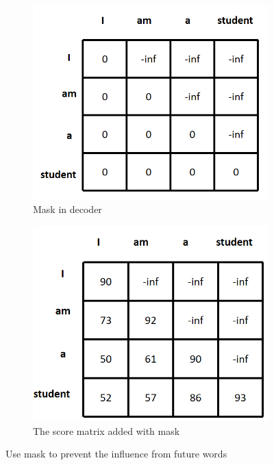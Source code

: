   \begin{figure}[htbp]
		\centering
		\begin{subfigure}{0.45\textwidth}
			\centering
			\includegraphics[width=0.8\linewidth]{example_images/mask}
			\caption{Mask in decoder}
			\label{Mask in decoder}
		\end{subfigure}
		\hfill
		\begin{subfigure}{0.45\textwidth}
			\centering
			\includegraphics[width=0.8\linewidth]{example_images/mask1}
			\caption{The score matrix added with mask}
			\label{The score matrix added with mask}
		\end{subfigure}
		\caption{Use mask to prevent the influence from future words}
		\label{Use mask to prevent the influence from future words}
	\end{figure}

